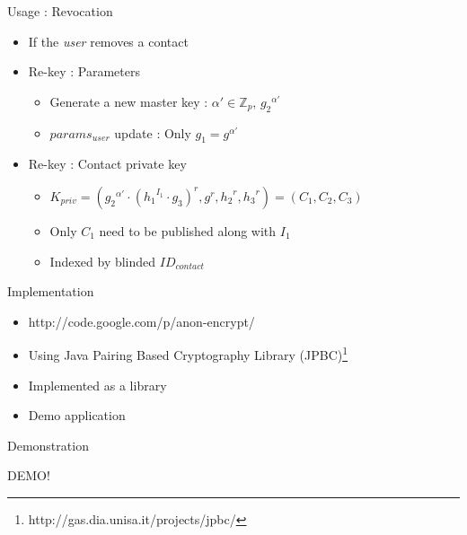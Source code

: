 \documentclass{beamer}
\begin{document}
\begin{frame}{Usage : Revocation}
\begin{itemize}
\item If the \emph{user} removes a contact
\item Re-key : Parameters
\begin{itemize}
\item Generate a new master key : $\alpha' \in \mathbb{Z}_p $,  ${g_2}^{\alpha'}$
\item $params_{user}$ update : Only $g_1 = g^{\alpha'}$ 
\end{itemize}
\item Re-key : Contact private key
\begin{itemize}
\item $K_{priv}=({{g_2}^{\alpha'}} \cdot {({{h_1}^{I_1}} \cdot {g_3} )}^r , g^r, {h_2}^r, {h_3}^r) = (C_1, C_2, C_3)$ 
\item Only $C_1$ need to be published along with $I_1$
\item Indexed by blinded $ID_{contact}$
\end{itemize}
\end{itemize}
\end{frame}


\begin{frame}{Implementation}
\begin{itemize}
\item http://code.google.com/p/anon-encrypt/
\item Using Java Pairing Based Cryptography Library (JPBC)\footnote{http://gas.dia.unisa.it/projects/jpbc/}
\item Implemented as a library
\item Demo application
\end{itemize}
\end{frame}

\begin{frame}{Demonstration}
\begin{center}
\Huge{DEMO!} \\ \smiley
\end{center}
\end{frame}
\end{document}
